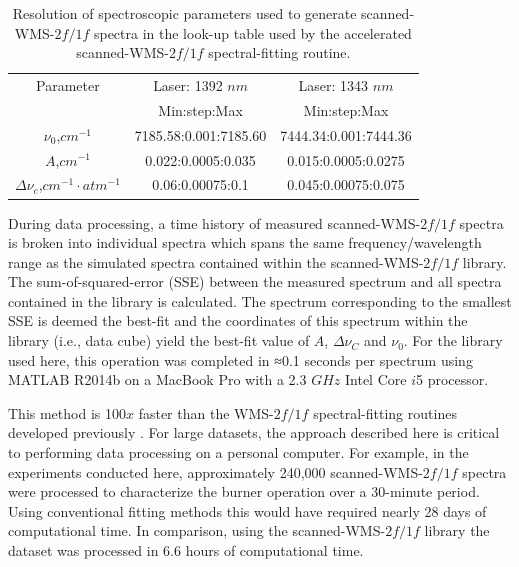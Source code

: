 \vspace{2mm}
\begin{table}[h]
\begin{center}
\begin{tabular}{ c c c }
\hline
Parameter & Laser: 1392 $nm$  & Laser: 1343 $nm$ \\
 & Min:step:Max & Min:step:Max\\ \hline
$\nu_0$,$cm^{-1}$ & 7185.58:0.001:7185.60 & 7444.34:0.001:7444.36\\ 
$A$,$cm^{-1}$ & 0.022:0.0005:0.035 & 0.015:0.0005:0.0275\\ 
$\Delta\nu_c$,$cm^{-1}\cdot atm^{-1}$ & 0.06:0.00075:0.1 & 0.045:0.00075:0.075\\ \hline
\end{tabular}
\caption{Resolution of spectroscopic parameters used to generate scanned-WMS-$2f/1f$ spectra in the look-up table used by the accelerated scanned-WMS-$2f/1f$ spectral-fitting routine.}
\label{table:ch4_2}
\end{center}
\end{table}

\vspace{-5mm}

During data processing, a time history of measured scanned-WMS-$2f/1f$ spectra is broken into individual spectra which spans the same frequency/wavelength range as the simulated spectra contained within the scanned-WMS-$2f/1f$ library. The sum-of-squared-error (SSE) between the measured spectrum and all spectra contained in the library is calculated. The spectrum corresponding to the smallest SSE is deemed the best-fit and the coordinates of this spectrum within the library (i.e., data cube) yield the best-fit value of $A$, $\Delta\nu_C$ and $\nu_0$. For the library used here, this operation was completed in ≈0.1 seconds per spectrum using MATLAB R2014b on a MacBook Pro with a 2.3 $GHz$ Intel Core $i$5 processor. 

This method is 100$x$ faster than the WMS-$2f/1f$ spectral-fitting routines developed previously \cite{Goldenstein2014}. For large datasets, the approach described here is critical to performing data processing on a personal computer. For example, in the experiments conducted here, approximately 240,000 scanned-WMS-$2f/1f$ spectra were processed to characterize the burner operation over a 30-minute period. Using conventional fitting methods this would have required nearly 28 days of computational time. In comparison, using the scanned-WMS-$2f/1f$ library the dataset was processed in 6.6 hours of computational time.

